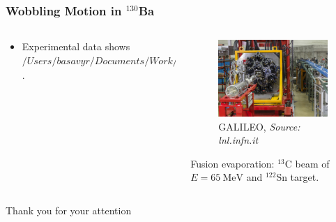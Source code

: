 \documentclass{beamer}
\begin{document}
\begin{frame}
	\frametitle{Wobbling Motion in $^{130}$Ba}
	\begin{columns}
		\begin{column}{0.55\textwidth}
			\begin{itemize}
				\item Experimental data shows $/Users/basavyr/Documents/Work/PhD/phd-resources/Papers/Wobbling-Nuclei/Wang_Wobbling-130Ba.pdf$. 
			\end{itemize}
		\end{column}
		\begin{column}{0.45\textwidth}
			\begin{figure}
				\centering
				\includegraphics[width=0.99\textwidth]{figures/galileo_exp.jpg}
				\caption{GALILEO, \textit{Source: lnl.infn.it}}
			\end{figure}
			Fusion evaporation: $^{13}$C beam of $E=65\ \text{MeV}$ and $^{122}$Sn target.
		\end{column}
	\end{columns}
\end{frame}




\begin{frame}[plain] %
	\begin{center}
		\bigskip\bigskip %
		{\Huge Thank you for your attention \faHeart}
	\end{center}
\end{frame}
\end{document}

